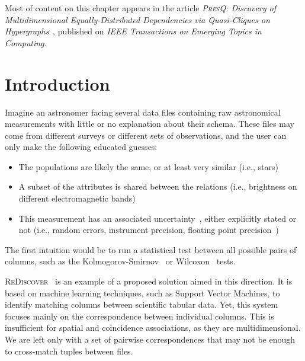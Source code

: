 Most of content on this chapter appears in the article
\emph{\textsc{PresQ}: Discovery of Multidimensional Equally-Distributed Dependencies via Quasi-Cliques on Hypergraphs}~\cite{AlvarezAyllonPresQ2022},
published on \emph{IEEE Transactions on Emerging Topics in Computing}.



\section{Introduction}

Imagine an astronomer facing several data files containing raw astronomical measurements
with little or no explanation about their schema. These files may come from different
surveys or different sets of observations, and the user can only make the following
educated guesses:

\begin{itemize}
    \item The populations are likely the same, or at least very similar (i.e., stars)
    \item A subset of the attributes is shared between the relations (i.e., brightness
        on different electromagnetic bands)
    \item This measurement has an associated uncertainty~\cite{Stonebraker2009}, either
        explicitly stated or not (i.e., random errors, instrument precision, floating point 
        precision~\cite{dawson2008comparing})
\end{itemize}

The first intuition would be to run a statistical test between all possible pairs of columns,
such as the Kolmogorov-Smirnov~\cite{Hodges1958} or Wilcoxon~\cite{Wilcoxon1945} tests.

\textsc{ReDiscover}~\cite{alawini2016} is an example of a proposed solution aimed in this
direction. It is based on machine learning techniques, such as Support Vector
Machines, to identify matching columns between scientific tabular data.
Yet, this system focuses mainly on the correspondence between individual columns.
This is insufficient for spatial and coincidence associations, as they are multidimensional.
We are left only with a set of pairwise correspondences that may not be enough to cross-match
tuples between files.

